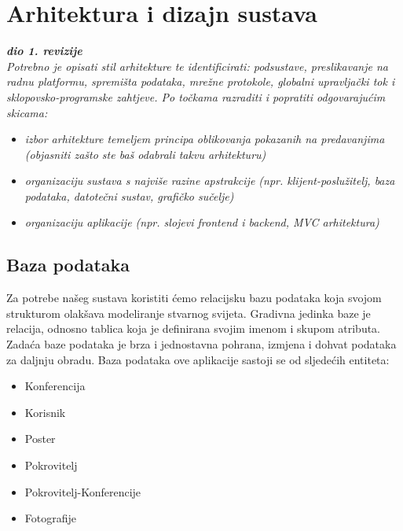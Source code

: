 \chapter{Arhitektura i dizajn sustava}
		
		\textbf{\textit{dio 1. revizije}}\\

		\textit{ Potrebno je opisati stil arhitekture te identificirati: podsustave, preslikavanje na radnu platformu, spremišta podataka, mrežne protokole, globalni upravljački tok i sklopovsko-programske zahtjeve. Po točkama razraditi i popratiti odgovarajućim skicama:}
	\begin{itemize}
		\item 	\textit{izbor arhitekture temeljem principa oblikovanja pokazanih na predavanjima (objasniti zašto ste baš odabrali takvu arhitekturu)}
		\item 	\textit{organizaciju sustava s najviše razine apstrakcije (npr. klijent-poslužitelj, baza podataka, datotečni sustav, grafičko sučelje)}
		\item 	\textit{organizaciju aplikacije (npr. slojevi frontend i backend, MVC arhitektura) }		
	\end{itemize}

	
		

		

				
		\section{Baza podataka}
			
		Za potrebe našeg sustava koristiti ćemo relacijsku bazu podataka koja svojom strukturom olakšava modeliranje stvarnog svijeta. Gradivna jedinka baze je relacija, odnosno tablica koja je definirana svojim imenom i skupom atributa. Zadaća baze podataka je brza i jednostavna pohrana, izmjena i dohvat podataka za daljnju obradu.
		Baza podataka ove aplikacije sastoji se od sljedećih entiteta: 
		
		\begin{itemize}
			\item Konferencija
			\item Korisnik
			\item Poster
			\item Pokrovitelj
			\item Pokrovitelj-Konferencije
			\item Fotografije
		\end{itemize}
		
